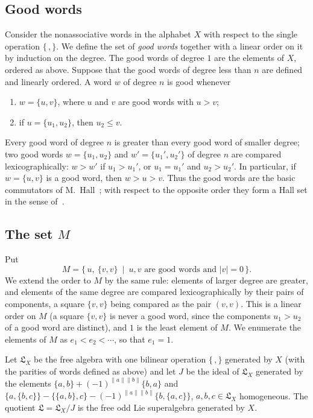 \documentclass[11pt,reqno]{amsart}
\newcommand{\LL}{\mathfrak L}
\newcommand{\rp}[1]{\|#1\|}
\theoremstyle{plain}
\theoremstyle{definition}
\theoremstyle{remark}
\begin{document}
\subsection*{Good words}
Consider the nonassociative words in the alphabet $X$ with respect to the single operation $\{\,,\}$.
We define the set of \emph{good words} together with a linear order on it by induction on the degree.
The good words of degree $1$ are the elements of $X$, ordered as above.
Suppose that the good words of degree less than $n$ are defined and linearly ordered.
A word $w$ of degree $n$ is good whenever
\begin{enumerate}
\item[(1)] $w=\{u,v\}$, where $u$ and $v$ are good words with $u>v$;
\item[(2)] if $u=\{u_1,u_2\}$, then $u_2\le v$.
\end{enumerate}
Every good word of degree $n$ is greater than every good word of smaller degree; two good words $w=\{u_1,u_2\}$ and $w'=\{u_1',u_2'\}$ of degree $n$ are compared lexicographically: $w>w'$ if $u_1>u_1'$, or $u_1=u_1'$ and $u_2>u_2'$.
In particular, if $w=\{u,v\}$ is a good word, then $w>u>v$.
Thus the good words are the basic commutators of M.~Hall~\cite{Hall50}; with respect to the opposite order they form a Hall set in the sense of~\cite[Section~4.1]{Reu93}.

\subsection*{The set \texorpdfstring{$M$}{M}}
Put
$$
M=\{\,u,\ \{v,v\}\ \mid\ u,v \text{ are good words and } |v|=0\,\}.
$$
We extend the order to $M$ by the same rule: elements of larger degree are greater, and elements of the same degree are compared lexicographically by their pairs of components, a square $\{v,v\}$ being compared as the pair $(v,v)$.
This is a linear order on $M$ (a square $\{v,v\}$ is never a good word, since the components $u_1>u_2$ of a good word are distinct), and $1$ is the least element of $M$.
We enumerate the elements of $M$ as $e_1<e_2<\cdots$, so that $e_1=1$.

Let $\LL_X$ be the free algebra with one bilinear operation $\{\,,\}$ generated by $X$ (with the parities of words defined as above) and let $J$ be the ideal of $\LL_X$ generated by the elements
$\{a,b\}+(-1)^{\rp a\rp b}\{b,a\}$ and $\{a,\{b,c\}\}-\{\{a,b\},c\}-(-1)^{\rp a\rp b}\{b,\{a,c\}\}$, $a,b,c\in\LL_X$ homogeneous.
The quotient $\LL=\LL_X/J$ is the free odd Lie superalgebra generated by $X$.
\end{document}
